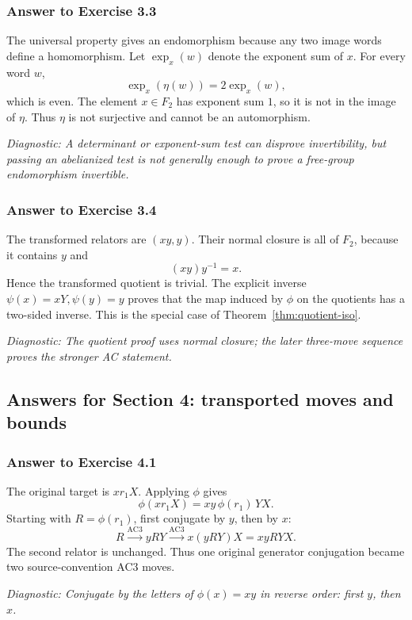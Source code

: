 \documentclass[11pt]{article}
\theoremstyle{definition}
\theoremstyle{remark}
\newcommand{\F}{F_2}
\newcommand{\AC}{\mathrm{AC}}
\newcommand{\diagnostic}[1]{\par\smallskip\textit{Diagnostic: #1}}
\begin{document}
\subsubsection*{Answer to Exercise 3.3}

The universal property gives an endomorphism because any two image words
define a homomorphism.  Let \(\exp_x(w)\) denote the exponent sum of \(x\).
For every word \(w\),
\[
\exp_x(\eta(w))=2\exp_x(w),
\]
which is even.  The element \(x\in\F\) has exponent sum \(1\), so it is not
in the image of \(\eta\).  Thus \(\eta\) is not surjective and cannot be an
automorphism.

\diagnostic{A determinant or exponent-sum test can disprove
invertibility, but passing an abelianized test is not generally enough to
prove a free-group endomorphism invertible.}

\subsubsection*{Answer to Exercise 3.4}

The transformed relators are \((xy,y)\).  Their normal closure is all of
\(\F\), because it contains \(y\) and
\[
(xy)y^{-1}=x.
\]
Hence the transformed quotient is trivial.  The explicit inverse
\(\psi(x)=xY,\psi(y)=y\) proves that the map induced by \(\phi\) on the
quotients has a two-sided inverse.  This is the special case of
Theorem~\ref{thm:quotient-iso}.

\diagnostic{The quotient proof uses normal closure; the later three-move
sequence proves the stronger AC statement.}

\subsection*{Answers for Section 4: transported moves and bounds}

\subsubsection*{Answer to Exercise 4.1}

The original target is \(xr_1X\).  Applying \(\phi\) gives
\[
\phi(xr_1X)=xy\,\phi(r_1)\,YX.
\]
Starting with \(R=\phi(r_1)\), first conjugate by \(y\), then by \(x\):
\[
R\xrightarrow{\AC3}yRY
\xrightarrow{\AC3}x(yRY)X=xyRYX.
\]
The second relator is unchanged.  Thus one original generator conjugation
became two source-convention AC3 moves.

\diagnostic{Conjugate by the letters of \(\phi(x)=xy\) in reverse order:
first \(y\), then \(x\).}
\end{document}
